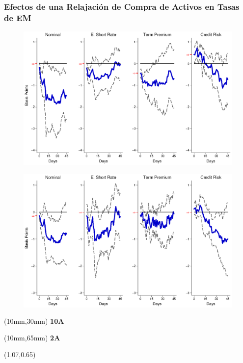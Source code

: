 \documentclass[12pt, aspectratio=169, xcolor=dvipsnames]{beamer}
\begin{document}


\begin{frame}[label=LSAPEM]
\frametitle{Efectos de una Relajación de Compra de Activos en Tasas de EM}
\begin{figure}[!htbp]
\begin{center} %
\includegraphics[trim={0cm 0cm 0cm 0cm},clip,height=0.45\textheight,width=0.85\linewidth]{../Figures/LPs/LagDep-FX/LSAP/EM/LSAPEMnomyptpphi120m.eps}
\par\end{center}
\end{figure}
\vspace{-0.5cm}
\begin{figure}[!htbp]
\begin{center} %
\includegraphics[trim={0cm 0cm 0cm 0.76cm},clip,height=0.45\textheight,width=0.85\linewidth]{../Figures/LPs/LagDep-FX/LSAP/EM/LSAPEMnomyptpphi24m.eps}
\par\end{center}
\end{figure}
\begin{textblock*}{8mm}(10mm,30mm)
\small \textbf{10A}
\end{textblock*}
\begin{textblock*}{8mm}(10mm,65mm)
\small \textbf{2A}
\end{textblock*}
\begin{textblock*}{5cm}(1.07\textwidth,0.65\textheight)
\hyperlink{LSAPUS}{}
\end{textblock*}
\end{frame}
\end{document}
